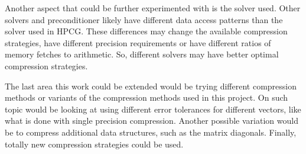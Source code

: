 Another aspect that could be further experimented with is the solver used.
Other solvers and preconditioner likely have different data access patterns than the solver used in HPCG.
These differences may change the available compression strategies, have different precision requirements or have different ratios of memory fetches to arithmetic.
So, different solvers may have better optimal compression strategies.

The last area this work could be extended would be trying different compression methods or variants of the compression methods used in this project.
On such topic would be looking at using different error tolerances for different vectors, like what is done with single precision compression.
Another possible variation would be to compress additional data structures, such as the matrix diagonals.
Finally, totally new compression strategies could be used.

